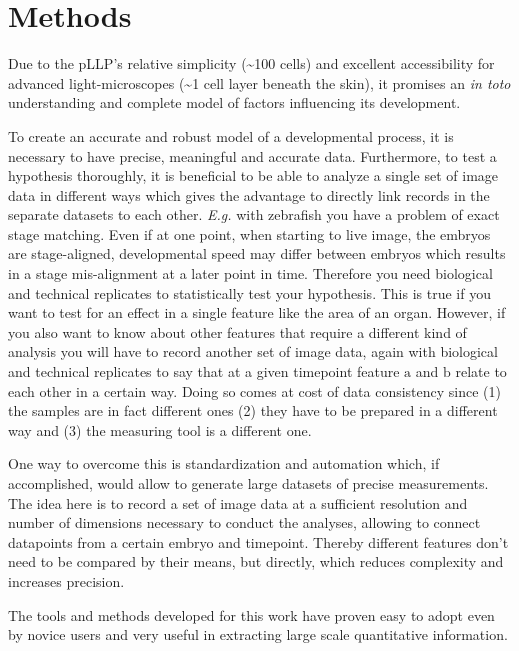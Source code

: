 \documentclass[10pt, b5paper, singlespacinge, twoside]{reedthesis} %
\theoremstyle{definition}
\theoremstyle{definition}
\theoremstyle{definition}
\theoremstyle{remark}
\begin{document}
\hypertarget{methods}{%
\section{Methods}\label{methods}}

Due to the pLLP's relative simplicity (\textasciitilde100 cells) and excellent accessibility for advanced light-microscopes (\textasciitilde1 cell layer beneath the skin), it promises an \emph{in toto} understanding and complete model of factors influencing its development.

To create an accurate and robust model of a developmental process, it is necessary to have precise, meaningful and accurate data. Furthermore, to test a hypothesis thoroughly, it is beneficial to be able to analyze a single set of image data in different ways which gives the advantage to directly link records in the separate datasets to each other. \emph{E.g.} with zebrafish you have a problem of exact stage matching. Even if at one point, when starting to live image, the embryos are stage-aligned, developmental speed may differ between embryos which results in a stage mis-alignment at a later point in time. Therefore you need biological and technical replicates to statistically test your hypothesis. This is true if you want to test for an effect in a single feature like the area of an organ. However, if you also want to know about other features that require a different kind of analysis you will have to record another set of image data, again with biological and technical replicates to say that at a given timepoint feature \(\mathrm{a}\) and \(\mathrm{b}\) relate to each other in a certain way. Doing so comes at cost of data consistency since (1) the samples are in fact different ones (2) they have to be prepared in a different way and (3) the measuring tool is a different one.

One way to overcome this is standardization and automation which, if accomplished, would allow to generate large datasets of precise measurements. The idea here is to record a set of image data at a sufficient resolution and number of dimensions necessary to conduct the analyses, allowing to connect datapoints from a certain embryo and timepoint. Thereby different features don't need to be compared by their means, but directly, which reduces complexity and increases precision.

The tools and methods developed for this work have proven easy to adopt even by novice users and very useful in extracting large scale quantitative information.
\end{document}
